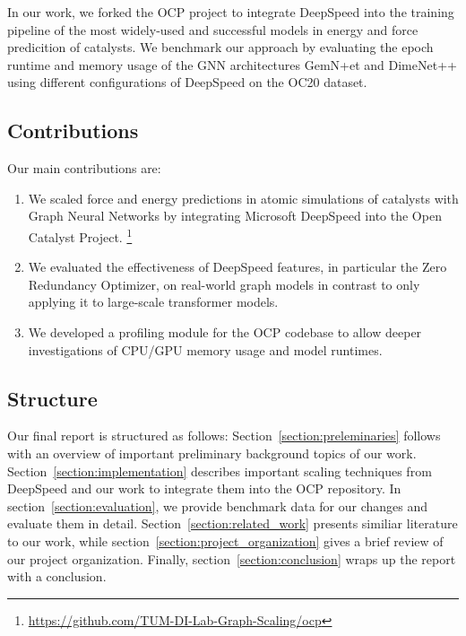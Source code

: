 In our work, we forked the OCP project to integrate DeepSpeed into the training pipeline of the most widely-used 
and successful models in energy and force predicition of catalysts. 
We benchmark our approach by evaluating the epoch runtime and memory usage of the GNN architectures GemN+et and 
DimeNet++ using different configurations of DeepSpeed on the OC20 dataset.


\subsection{Contributions}

Our main contributions are:

\begin{enumerate}
    \item We scaled force and energy predictions in atomic simulations of catalysts with Graph Neural Networks 
    by integrating Microsoft DeepSpeed into the Open Catalyst Project.
    \footnote{\url{https://github.com/TUM-DI-Lab-Graph-Scaling/ocp}}
    \item We evaluated the effectiveness of DeepSpeed features, in particular the Zero Redundancy Optimizer, on 
    real-world graph models in contrast to only applying it to large-scale transformer models.
    \item We developed a profiling module for the OCP codebase to allow deeper investigations of CPU/GPU memory 
    usage and model runtimes.
\end{enumerate}

\subsection{Structure}

Our final report is structured as follows: Section~\ref{section:preleminaries} follows with an overview of 
important preliminary background topics of our work. Section~\ref{section:implementation} describes important 
scaling techniques from DeepSpeed and our work to integrate them into the OCP repository. In 
section~\ref{section:evaluation}, we provide benchmark data for our changes and evaluate them in detail. 
Section~\ref{section:related_work} presents similiar literature to our work, while section~\ref{section:project_organization} 
gives a brief review of our project organization. Finally, section~\ref{section:conclusion} wraps up the 
report with a conclusion.